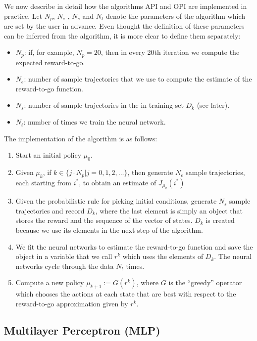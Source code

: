 \documentclass[11pt, oneside]{article}   	%
\begin{document}
We now describe in detail how the algorithms API and OPI are implemented in practice. Let $N_{p}$, $N_{e}$ , $N_{s}$ and $N_{t}$ denote the parameters of the algorithm which are set by the user in advance. Even thought the definition of these parameters can be inferred from the algorithm, it is more clear to define them separately:
\begin{itemize}
    \item $N_{p}$: if, for example, $N_{p}=20$, then in every 20th iteration we compute the expected reward-to-go.
    \item $N_{e}$: number of sample trajectories that we use to compute the estimate of the reward-to-go function.
    \item $N_{s}$: number of sample trajectories in the in training set $D_{k}$ (see later).
    \item $N_{t}$: number of times we train the neural network.
\end{itemize}
The implementation of the algorithm is as follows:
\begin{enumerate}
    \item Start an initial policy $\mu_{0}$.
    \item Given $\mu_{k}$, if $k \in \{j \cdot N_{p} | j=0,1,2,…\}$, then generate $N_{e}$ sample trajectories, each starting from $i^{*}$, to obtain an estimate of $J_{\mu_{k}}(i^{*})$
    \item Given the probabilistic rule for picking initial conditions, generate $N_{s}$ sample trajectories and record $D_{k}$, where the last element is simply an object that stores the reward and the sequence of the vector of states. $D_{k}$ is created because we use its elements in the next step of the algorithm.
    \item We fit the neural networks to estimate the reward-to-go function and save the object in a variable that we call $r^{k}$ which uses the elements of $D_{k}$. The neural networks cycle through the data $N_{t}$ times.
    \item Compute a new policy $\mu_{k+1} := G(r^{k})$, where $G$ is the “greedy” operator which chooses the actions at each state that are best with respect to the reward-to-go approximation given by $r^{k}$.
\end{enumerate}

\subsection{Multilayer Perceptron (MLP)}
\end{document}
